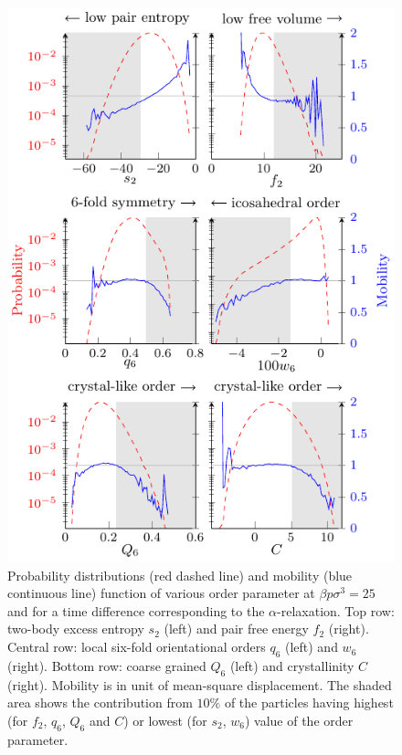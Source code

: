 \documentclass[twocolumn,superscriptaddress]{revtex4}
\begin{document}
\begin{figure}
	\centering
	\includegraphics{fig_distrib}
	\caption{Probability distributions (red dashed line) and mobility (blue continuous line) function of various order parameter at $\beta p\sigma^3=25$ and for a time difference corresponding to the $\alpha$-relaxation. Top row: two-body excess entropy $s_2$ (left) and pair free energy $f_2$ (right). Central row: local six-fold orientational orders $q_6$ (left) and $w_6$ (right). Bottom row: coarse grained $Q_6$ (left) and crystallinity $C$ (right). Mobility is in unit of mean-square displacement. The shaded area shows the contribution from $10\%$ of the particles having highest (for $f_2$, $q_6$, $Q_6$ and $C$) or lowest (for $s_2$, $w_6$) value of the order parameter.}
	\label{fig:distrib}
\end{figure}
\end{document}
